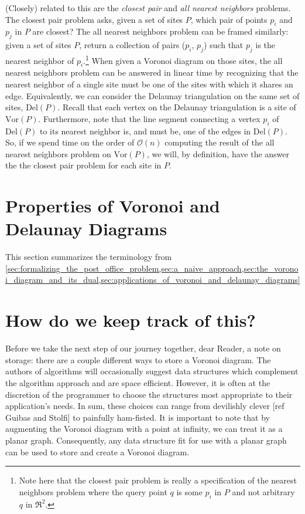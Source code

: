 \documentclass[12pt,twoside]{reedthesis}
\begin{document}
    (Closely) related to this are the \emph{closest pair} and \emph{all nearest neighbors} problems. The closest pair problem asks, given a set of sites $P$, which pair of points $p_{i}$ and $p_{j}$ in $P$ are closest? The all nearest neighbors problem can be framed similarly: given a set of sites $P$, return a collection of pairs ($p_{i}$, $p_{j}$) such that $p_{j}$ is the nearest neighbor of $p_{i}$.\footnote{Note here that the closest pair problem is really a specification of the nearest neighbors problem where the query point $q$ is some $p_{i}$ in $P$ and not arbitrary $q$ in $\Re^2$.} When given a Voronoi diagram on those sites, the all nearest neighbors problem can be answered in linear time by recognizing that the nearest neighbor of a single site must be one of the sites with which it shares an edge. Equivalently, we can consider the Delaunay triangulation on the same set of sites, $\mbox{Del}(P)$. Recall that each vertex on the Delaunay triangulation is a site of $\mbox{Vor}(P)$. Furthermore, note that the line segment connecting a vertex $p_{i}$ of $\mbox{Del}(P)$ to its nearest neighbor is, and must be, one of the edges in $\mbox{Del}(P)$. So, if we spend time on the order of $\mathcal{O}(n)$ computing the result of the all nearest neighbors problem on $\mbox{Vor}(P)$, we will, by definition, have the answer the the closest pair problem for each site in $P$. 

  
  \section{Properties of Voronoi and Delaunay Diagrams} %
  \label{sec:properties_of_voronoi_and_delaunay_diagrams}
  This section summarizes the terminology from \cref{sec:formalizing_the_post_office_problem,sec:a_naive_approach,sec:the_voronoi_diagram_and_its_dual,sec:applications_of_voronoi_and_delaunay_diagrams} 

  \section{How do we keep track of this?} %
  \label{sec:how_do_we_keep_track_of_this}
    Before we take the next step of our journey together, dear Reader, a note on storage: there are a couple different ways to store a Voronoi diagram. The authors of algorithms will occasionally suggest data structures which complement the algorithm approach and are space efficient. However, it is often at the discretion of the programmer to choose the structures most appropriate to their application's needs. In sum, these choices can range from devilishly clever [ref Guibas and Stolfi] to painfully ham-fisted. It is important to note that by augmenting the Voronoi diagram with a point at infinity, we can treat it as a planar graph. Consequently, any data structure fit for use with a planar graph can be used to store and create a Voronoi diagram. \par
\end{document}
